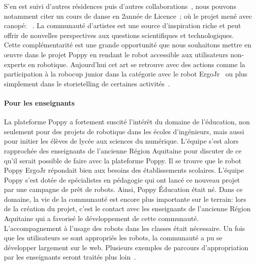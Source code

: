             S'en est suivi d'autres résidences puis d'autres collaborations~, nous pouvons notamment citer un cours de danse en 2\ieme année de Licence~; où le projet mené avec canopé: ~.
            La communauté d'artistes est une source d'inspiration riche et peut offrir de nouvelles perspectives aux questions scientifiques et technologiques. Cette complémentarité est une grande opportunité que nous souhaitons mettre en œuvre dans le projet Poppy en rendant le robot accessible aux utilisateurs non-experts en robotique.
            Aujourd'hui cet art se retrouve avec des actions comme la participation à la robocup junior dans la catégorie  avec le robot ErgoJr~ ou plus simplement dans le storietelling de certaines activités~.
        \paragraph{Pour les enseignants}
            La plateforme Poppy a fortement suscité l'intérêt du domaine de l'éducation, non seulement pour des projets de robotique dans les écoles d'ingénieurs, mais aussi pour initier les élèves de lycée aux sciences du numérique. L'équipe s'est alors rapprochée des enseignants de l'ancienne Région Aquitaine pour discuter de ce qu'il serait possible de faire avec la plateforme Poppy. Il se trouve que le robot Poppy ErgoJr répondait bien aux besoins des établissements scolaires. L'équipe Poppy s'est dotée de spécialistes en pédagogie qui ont lancé ce nouveau projet par une campagne de prêt de robots. Ainsi, Poppy Éducation était né. Dans ce domaine, la vie de la communauté est encore plus importante sur le terrain: lors de la création du projet, c'est le contact avec les enseignants de l'ancienne Région Aquitaine qui a favorisé le développement de cette communauté. L'accompagnement à l'usage des robots dans les classes était nécessaire. Un fois que les utilisateurs se sont appropriés les robots, la communauté a pu se développer largement sur le web. Plusieurs exemples de parcours d'appropriation par les enseignants seront traités plus loin~.

